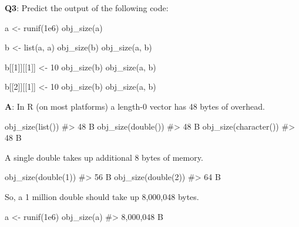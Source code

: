 \documentclass[
]{krantz}
\makeatletter
\newenvironment{Shaded}{\begin{snugshade}}{\end{snugshade}}
\newcommand{\CommentTok}[1]{\textcolor[rgb]{0.56,0.35,0.01}{\textit{#1}}}
\newcommand{\DecValTok}[1]{\textcolor[rgb]{0.00,0.00,0.81}{#1}}
\newcommand{\FloatTok}[1]{\textcolor[rgb]{0.00,0.00,0.81}{#1}}
\newcommand{\KeywordTok}[1]{\textcolor[rgb]{0.13,0.29,0.53}{\textbf{#1}}}
\newcommand{\NormalTok}[1]{#1}
\newcommand{\StringTok}[1]{\textcolor[rgb]{0.31,0.60,0.02}{#1}}
\newenvironment{kframe}{%
\medskip{}
\setlength{\fboxsep}{.8em}
 \def\at@end@of@kframe{}%
 \ifinner\ifhmode%
  \def\at@end@of@kframe{\end{minipage}}%
  \begin{minipage}{\columnwidth}%
 \fi\fi%
 \def\FrameCommand##1{\hskip\@totalleftmargin \hskip-\fboxsep
 \colorbox{shadecolor}{##1}\hskip-\fboxsep
     \hskip-\linewidth \hskip-\@totalleftmargin \hskip\columnwidth}%
 \MakeFramed {\advance\hsize-\width
   \@totalleftmargin\z@ \linewidth\hsize
   \@setminipage}}%
 {\par\unskip\endMakeFramed%
 \at@end@of@kframe}
\renewenvironment{Shaded}{\begin{kframe}}{\end{kframe}}
\renewcommand{\KeywordTok} [1]{\textcolor[rgb]{0.00,0.44,0.13}{{#1}}}
\renewcommand{\DecValTok}  [1]{\textcolor[rgb]{0.25,0.63,0.44}{{#1}}}
\renewcommand{\FloatTok}   [1]{\textcolor[rgb]{0.25,0.63,0.44}{{#1}}}
\renewcommand{\StringTok}  [1]{\textcolor[rgb]{0.25,0.44,0.63}{{#1}}}
\renewcommand{\CommentTok} [1]{\textcolor[rgb]{0.38,0.63,0.69}{{#1}}}
\renewcommand{\NormalTok}  [1]{{#1}}
\makeatother
\begin{document}
\textbf{{Q3}}: Predict the output of the following code:

\begin{Shaded}
\begin{Highlighting}[]
\NormalTok{a <-}\StringTok{ }\KeywordTok{runif}\NormalTok{(}\FloatTok{1e6}\NormalTok{)}
\KeywordTok{obj_size}\NormalTok{(a)}

\NormalTok{b <-}\StringTok{ }\KeywordTok{list}\NormalTok{(a, a)}
\KeywordTok{obj_size}\NormalTok{(b)}
\KeywordTok{obj_size}\NormalTok{(a, b)}

\NormalTok{b[[}\DecValTok{1}\NormalTok{]][[}\DecValTok{1}\NormalTok{]] <-}\StringTok{ }\DecValTok{10}
\KeywordTok{obj_size}\NormalTok{(b)}
\KeywordTok{obj_size}\NormalTok{(a, b)}

\NormalTok{b[[}\DecValTok{2}\NormalTok{]][[}\DecValTok{1}\NormalTok{]] <-}\StringTok{ }\DecValTok{10}
\KeywordTok{obj_size}\NormalTok{(b)}
\KeywordTok{obj_size}\NormalTok{(a, b)}
\end{Highlighting}
\end{Shaded}

\textbf{{A}}: In R (on most platforms) a length-0
vector has 48 bytes of overhead.

\begin{Shaded}
\begin{Highlighting}[]
\KeywordTok{obj_size}\NormalTok{(}\KeywordTok{list}\NormalTok{())}
\CommentTok{#> 48 B}
\KeywordTok{obj_size}\NormalTok{(}\KeywordTok{double}\NormalTok{())}
\CommentTok{#> 48 B}
\KeywordTok{obj_size}\NormalTok{(}\KeywordTok{character}\NormalTok{())}
\CommentTok{#> 48 B}
\end{Highlighting}
\end{Shaded}

A single double takes up additional 8 bytes of memory.

\begin{Shaded}
\begin{Highlighting}[]
\KeywordTok{obj_size}\NormalTok{(}\KeywordTok{double}\NormalTok{(}\DecValTok{1}\NormalTok{))}
\CommentTok{#> 56 B}
\KeywordTok{obj_size}\NormalTok{(}\KeywordTok{double}\NormalTok{(}\DecValTok{2}\NormalTok{))}
\CommentTok{#> 64 B}
\end{Highlighting}
\end{Shaded}

So, a 1 million double should take up 8,000,048 bytes.

\begin{Shaded}
\begin{Highlighting}[]
\NormalTok{a <-}\StringTok{ }\KeywordTok{runif}\NormalTok{(}\FloatTok{1e6}\NormalTok{)}
\KeywordTok{obj_size}\NormalTok{(a)}
\CommentTok{#> 8,000,048 B}
\end{Highlighting}
\end{Shaded}
\end{document}
